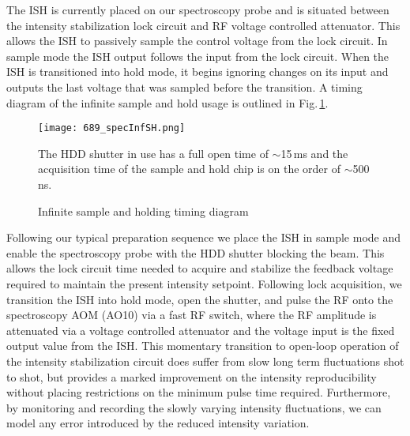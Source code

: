 The ISH is currently placed on our spectroscopy probe and is situated between the intensity stabilization lock circuit and RF voltage controlled attenuator.
This allows the ISH to passively sample the control voltage from the lock circuit.
In sample mode the ISH output follows the input from the lock circuit.
When the ISH is transitioned into hold mode, it begins ignoring changes on its input and outputs the last voltage that was sampled before the transition.
A timing diagram of the infinite sample and hold usage is outlined in Fig.\,\ref{fig:689specInfSH}.
	\begin{figure}
	\centerline{
		\texttt{[image: 689\_specInfSH.png]}}
		\caption{Infinite sample and holding timing diagram}{The HDD shutter in use has a full open time of $\sim$15\,ms and the acquisition time of the sample and hold chip is on the order of $\sim$500\,ns.}
		 \label{fig:689specInfSH}
	\end{figure}
Following our typical preparation sequence we place the ISH in sample mode and enable the spectroscopy probe with the HDD shutter blocking the beam. 
This allows the lock circuit time needed to acquire and stabilize the feedback voltage required to maintain the present intensity setpoint.
Following lock acquisition, we transition the ISH into hold mode, open the shutter, and pulse the RF onto the spectroscopy AOM (AO10) via a fast RF switch, where the RF amplitude is attenuated via a voltage controlled attenuator and the voltage input is the fixed output value from the ISH.
This momentary transition to open-loop operation of the intensity stabilization circuit does suffer from slow long term fluctuations shot to shot, but provides a marked improvement on the intensity reproducibility without placing restrictions on the minimum pulse time required.
Furthermore, by monitoring and recording the slowly varying intensity fluctuations, we can model any error introduced by the reduced intensity variation.

